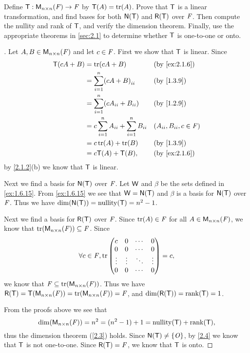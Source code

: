 \exercisesection

\setcounter{ex}{5}
\begin{ex}\label{ex:2.1.6}
	Define \(\mathsf{T} : \mathsf{M}_{{n} \times n}({\mathit{F}}) \to \mathit{F}\) by \(\T(A) = \tr[A]\).
	Prove that \(\mathsf{T}\) is a linear transformation, and find bases for both \(\ns{\T}\) and \(\rg{\T}\) over \(\mathit{F}\).
	Then compute the nullity and rank of \(\mathsf{T}\), and verify the dimension theorem.
	Finally, use the appropriate theorems in \cref{sec:2.1} to determine whether \(\mathsf{T}\) is one-to-one or onto.
\end{ex}

\begin{proof}[]
	Let \(A, B \in \mathsf{M}_{{n} \times n}({\mathit{F}})\) and let \(c \in \mathit{F}\).
	First we show that \(\mathsf{T}\) is linear.
	Since
	\begin{align*}
		\T(cA + B) & = \tr[cA + B]                                       &  & \by{ex:2.1.6}                \\
		           & = \sum_{i = 1}^n \pa{cA + B}_{i i}                  &  & \by{1.3.9}                   \\
		           & = \sum_{i = 1}^n \pa{cA_{i i} + B_{i i}}            &  & \by{1.2.9}                   \\
		           & = c \sum_{i = 1}^n A_{i i} + \sum_{i = 1}^n B_{i i} &  & (A_{i i}, B_{i i}, c \in \F) \\
		           & = c \tr[A] + \tr[B]                                 &  & \by{1.3.9}                   \\
		           & = c \T(A) + \T(B),                                  &  & \by{ex:2.1.6}
	\end{align*}
	by \cref{2.1.2}(b) we know that \(\mathsf{T}\) is linear.

	Next we find a basis for \(\ns{\T}\) over \(\mathit{F}\).
	Let \(\mathsf{W}\) and \(\beta\) be the sets defined in \cref{ex:1.6.15}.
	From \cref{ex:1.6.15} we see that \(\W = \ns{\T}\) and \(\beta\) is a basis for \(\ns{\T}\) over \(\mathit{F}\).
	Thus we have \(\dim(\ns{\T}) = \nt{\T} = n^2 - 1\).

	Next we find a basis for \(\rg{\T}\) over \(\mathit{F}\).
	Since \(\tr[A] \in \F\) for all \(A \in \mathsf{M}_{{n} \times n}({\mathit{F}})\), we know that \(\tr[\ms{n}{n}{\F}] \subseteq \F\).
	Since
	\[
		\forall c \in \F, \tr\begin{pmatrix}
			c      & 0      & \cdots & 0      \\
			0      & 0      & \cdots & 0      \\
			\vdots & \vdots & \ddots & \vdots \\
			0      & 0      & \cdots & 0
		\end{pmatrix} = c,
	\]
	we know that \(\F \subseteq \tr[\ms{n}{n}{\F}]\).
	Thus we have \(\rg{\T} = \T(\ms{n}{n}{\F}) = \tr[\ms{n}{n}{\F}] = \F\), and \(\dim(\rg{\T}) = \rk{\T} = 1\).

	From the proofs above we see that
	\[
		\dim(\ms{n}{n}{\F}) = n^2 = (n^2 - 1) + 1 = \nt{\T} + \rk{\T},
	\]
	thus the dimension theorem (\cref{2.3}) holds.
	Since \(\ns{\T} \neq \set{\zm}\), by \cref{2.4} we know that \(\mathsf{T}\) is not one-to-one.
	Since \(\rg{\T} = \F\), we know that \(\mathsf{T}\) is onto.
\end{proof}

